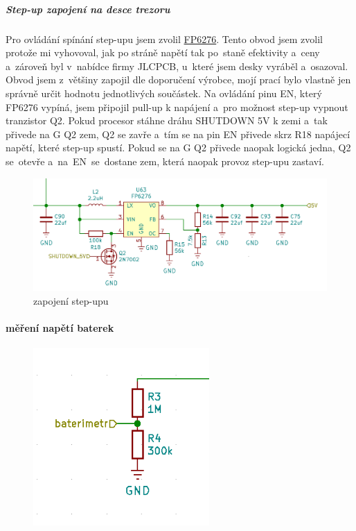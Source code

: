\subparagraph*{Step-up zapojení na desce trezoru}
Pro ovládání spínání step-upu jsem zvolil \href{https://datasheet.lcsc.com/szlcsc/Feeling-Tech-FP6276AXR-G1_C83308.pdf}{FP6276}.
Tento obvod jsem zvolil protože mi vyhovoval, jak po stráně napětí tak po~staně efektivity a~ceny a~zároveň byl v~nabídce firmy JLCPCB,
u~které jsem desky vyráběl a~osazoval. 
Obvod jsem z~většiny zapojil dle doporučení výrobce, mojí prací bylo vlastně jen správně určit hodnotu 
jednotlivých součástek. Na ovládání pinu EN, který FP6276 vypíná, jsem připojil pull-up k napájení a~pro možnost step-up vypnout tranzistor Q2. 
Pokud procesor stáhne dráhu SHUTDOWN 5V k zemi a~tak přivede na G Q2 zem, Q2 se zavře a~tím se na pin EN přivede skrz R18 napájecí napětí, 
které step-up spustí. Pokud se na G Q2 přivede naopak logická jedna, Q2 se~otevře a~na~EN~se~dostane zem, která naopak provoz step-upu zastaví.

\begin{figure}[htbp]
    \centering
    \includegraphics[width=400pt]{kapitoly/obrazky/E4/napajeni/step-up.png}
    \caption{zapojení step-upu}
    \label{fig:E4-step-up}
\end{figure}

\newpage

\paragraph*{měření napětí baterek}

\begin{figure}
    \centering
    \includegraphics[width=0.6\textwidth]{kapitoly/obrazky/E4/napajeni/delic_baterimetru.png}
    \caption{\label{fig:frog1}}
\end{figure}

